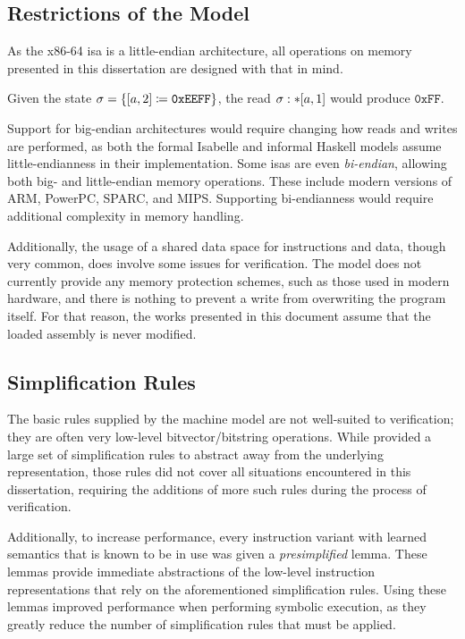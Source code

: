 \subsection{Restrictions of the Model}
As the x86-64 \ac{isa} is a little-endian architecture,%
all operations on memory presented in this dissertation are designed with that in mind.
\begin{example}
  Given the state $\sigma=\{[a,2]\coloneqq\mathtt{0xEEFF}\}$,
  the read $\sigma:\ast[a,1]$ would produce $\mathtt{0xFF}$.
\end{example}
Support for big-endian architectures would require changing how reads and writes%
are performed, as both the formal Isabelle and informal Haskell models
assume little-endianness in their implementation.
Some \acp{isa} are even \emph{bi-endian}, allowing both big- and little-endian%
memory operations. These include modern versions of ARM, PowerPC, SPARC, and MIPS.
Supporting bi-endianness would require additional complexity in memory handling.

Additionally,
the usage of a shared data space for instructions and data, though very common,
does involve some issues for verification.
The model does not currently provide any memory protection schemes,%
such as those used in modern hardware,
and there is nothing to prevent a write from overwriting the program itself.
For that reason,
the works presented in this document assume that the loaded assembly is never modified.

\subsection{Simplification Rules}\label{se:simplification}
The basic rules supplied by the machine model are not well-suited to verification;
they are often very low-level bitvector/bitstring operations.
While \citet{roessle2019} provided a large set of simplification rules
to abstract away from the underlying representation,
those rules did not cover all situations encountered in this dissertation,
requiring the additions of more such rules during the process of verification.

Additionally, to increase performance,
every instruction variant with learned semantics that is known to be in use
was given a \emph{presimplified} lemma.%
These lemmas provide immediate abstractions of the low-level instruction representations
that rely on the aforementioned simplification rules.
Using these lemmas improved performance when performing symbolic execution,
as they greatly reduce the number of simplification rules that must be applied.


